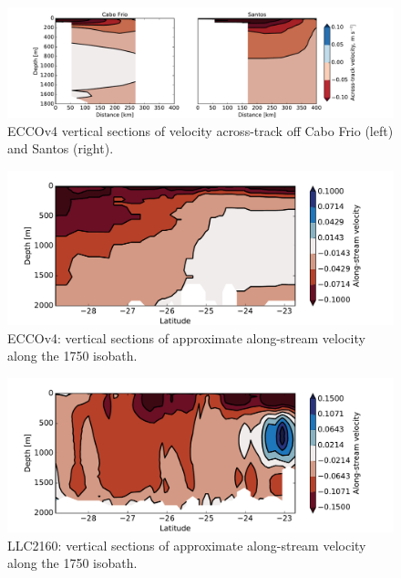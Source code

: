 \documentclass[11pt]{article}
\begin{document}
\begin{figure}[!ht]
\label{ECCOv4Sec}
  \centering
      \includegraphics[width=1.05\textwidth]{figs/ECCOv4_VelSections.pdf}
  \caption{ECCOv4 vertical sections of velocity across-track off Cabo Frio (left)
          and Santos (right).}
\end{figure}

\begin{figure}[!ht]
  \centering
      \includegraphics[width=1.05\textwidth]{figs/ECCOv4_AlonTrackVel.pdf}
  \caption{ECCOv4: vertical sections of approximate along-stream velocity along
          the 1750 isobath.}
          \label{ECCOv4Thick}
\end{figure}

\begin{figure}[!ht]
  \centering
      \includegraphics[width=1.05\textwidth]{figs/LLC2160_AlonTrackVel.pdf}
  \caption{LLC2160: vertical sections of approximate along-stream velocity along
          the 1750 isobath.}
          \label{LLC2160Thick}
\end{figure}
\end{document}
